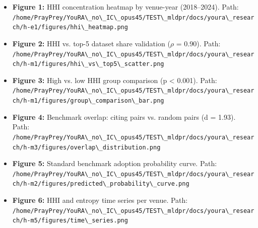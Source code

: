 
\begin{itemize}
\item \textbf{Figure 1:} HHI concentration heatmap by venue-year (2018--2024). Path: \texttt{/home/PrayPrey/YouRA\textbackslash \_no\textbackslash \_IC\textbackslash \_opus45/TEST\textbackslash \_mldpr/docs/youra\textbackslash \_research/h-e1/figures/hhi\textbackslash \_heatmap.png}
\end{itemize}

\begin{itemize}
\item \textbf{Figure 2:} HHI vs. top-5 dataset share validation ($\rho$ = 0.90). Path: \texttt{/home/PrayPrey/YouRA\textbackslash \_no\textbackslash \_IC\textbackslash \_opus45/TEST\textbackslash \_mldpr/docs/youra\textbackslash \_research/h-m1/figures/hhi\textbackslash \_vs\textbackslash \_top5\textbackslash \_scatter.png}
\end{itemize}

\begin{itemize}
\item \textbf{Figure 3:} High vs. low HHI group comparison (p < 0.001). Path: \texttt{/home/PrayPrey/YouRA\textbackslash \_no\textbackslash \_IC\textbackslash \_opus45/TEST\textbackslash \_mldpr/docs/youra\textbackslash \_research/h-m1/figures/group\textbackslash \_comparison\textbackslash \_bar.png}
\end{itemize}

\begin{itemize}
\item \textbf{Figure 4:} Benchmark overlap: citing pairs vs. random pairs (d = 1.93). Path: \texttt{/home/PrayPrey/YouRA\textbackslash \_no\textbackslash \_IC\textbackslash \_opus45/TEST\textbackslash \_mldpr/docs/youra\textbackslash \_research/h-m3/figures/overlap\textbackslash \_distribution.png}
\end{itemize}

\begin{itemize}
\item \textbf{Figure 5:} Standard benchmark adoption probability curve. Path: \texttt{/home/PrayPrey/YouRA\textbackslash \_no\textbackslash \_IC\textbackslash \_opus45/TEST\textbackslash \_mldpr/docs/youra\textbackslash \_research/h-m2/figures/predicted\textbackslash \_probability\textbackslash \_curve.png}
\end{itemize}

\begin{itemize}
\item \textbf{Figure 6:} HHI and entropy time series per venue. Path: \texttt{/home/PrayPrey/YouRA\textbackslash \_no\textbackslash \_IC\textbackslash \_opus45/TEST\textbackslash \_mldpr/docs/youra\textbackslash \_research/h-m5/figures/time\textbackslash \_series.png}
\end{itemize}

